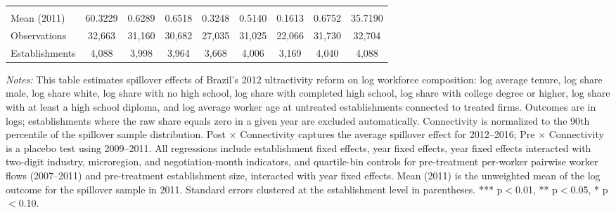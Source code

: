 \begin{table}[H]
\begin{threeparttable}
{\begin{tabular}{lcccccccc}
  &  &  &  &  &  &  &  & \\
Mean (2011) & 60.3229 & 0.6289 & 0.6518 & 0.3248 & 0.5140 & 0.1613 & 0.6752 & 35.7190 \\
Observations & 32{,}663 & 31{,}160 & 30{,}682 & 27{,}035 & 31{,}025 & 22{,}066 & 31{,}730 & 32{,}704 \\
Establishments & 4{,}088 & 3{,}998 & 3{,}964 & 3{,}668 & 4{,}006 & 3{,}169 & 4{,}040 & 4{,}088 \\
\bottomrule
\end{tabular}%
}
\scriptsize
\begin{tablenotes}
\item \textit{Notes:} This table estimates spillover effects of Brazil's 2012 ultractivity reform on log workforce composition: log average tenure, log share male, log share white, log share with no high school, log share with completed high school, log share with college degree or higher, log share with at least a high school diploma, and log average worker age at untreated establishments connected to treated firms. Outcomes are in logs; establishments where the raw share equals zero in a given year are excluded automatically. Connectivity is normalized to the 90th percentile of the spillover sample distribution. Post $\times$ Connectivity captures the average spillover effect for 2012--2016; Pre $\times$ Connectivity is a placebo test using 2009--2011. All regressions include establishment fixed effects, year fixed effects, year fixed effects interacted with two-digit industry, microregion, and negotiation-month indicators, and quartile-bin controls for pre-treatment per-worker pairwise worker flows (2007--2011) and pre-treatment establishment size, interacted with year fixed effects. Mean (2011) is the unweighted mean of the log outcome for the spillover sample in 2011. Standard errors clustered at the establishment level in parentheses. *** p$<$0.01, ** p$<$0.05, * p$<$0.10.
\end{tablenotes}
\end{threeparttable}
\end{table}
